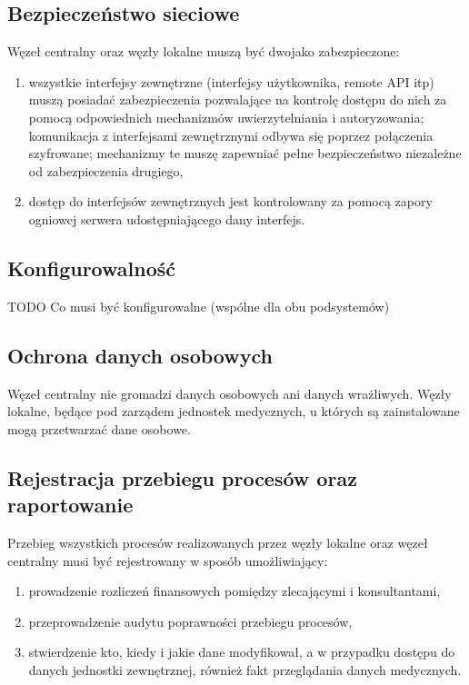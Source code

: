 \documentclass[a4paper]{article}
\begin{document}
\subsection{Bezpieczeństwo sieciowe}
Węzeł centralny oraz węzły lokalne muszą być dwojako zabezpieczone:
\begin{enumerate}
\item wszystkie interfejsy zewnętrzne (interfejsy użytkownika, remote API itp) muszą posiadać zabezpieczenia
pozwalające na kontrolę dostępu do nich za pomocą odpowiednich mechanizmów uwierzytelniania i autoryzowania;
komunikacja z interfejsami zewnętrznymi odbywa się poprzez połączenia szyfrowane; mechanizmy te muszę zapewniać pełne bezpieczeństwo niezależne od zabezpieczenia drugiego,
\item dostęp do interfejsów zewnętrznych jest kontrolowany za pomocą zapory ogniowej serwera udostępniającego
dany interfejs.
\end{enumerate}

\subsection{Konfigurowalność}

TODO Co musi być konfigurowalne (wspólne dla obu podsystemów)

\subsection{Ochrona danych osobowych}

Węzeł centralny nie gromadzi danych osobowych ani danych wrażliwych. Węzły lokalne, będące pod zarządem jednostek medycznych, u których są zainstalowane mogą przetwarzać dane osobowe.

\subsection{Rejestracja przebiegu procesów oraz raportowanie}

Przebieg wszystkich procesów realizowanych przez węzły lokalne oraz węzeł 
centralny musi być rejestrowany w sposób umożliwiający: 
\begin{enumerate}
  \item prowadzenie rozliczeń finansowych pomiędzy zlecającymi i konsultantami,
  \item przeprowadzenie audytu poprawności przebiegu procesów,
  \item stwierdzenie kto, kiedy i jakie dane modyfikował, a w przypadku dostępu do danych jednostki zewnętrznej, również fakt przeglądania danych medycznych.
\end{enumerate}
\end{document}
